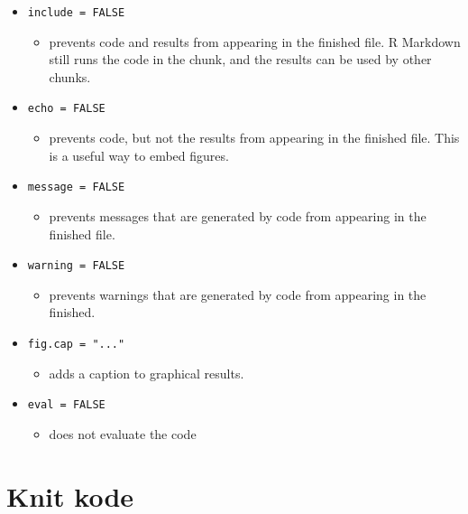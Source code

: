\documentclass[
]{book}
\providecommand{\tightlist}{%
  \setlength{\itemsep}{0pt}\setlength{\parskip}{0pt}}
\begin{document}
\begin{itemize}
\tightlist
\item
  \texttt{include\ =\ FALSE}

  \begin{itemize}
  \tightlist
  \item
    prevents code and results from appearing in the finished file. R Markdown still runs the code in the chunk, and the results can be used by other chunks.
  \end{itemize}
\item
  \texttt{echo\ =\ FALSE}

  \begin{itemize}
  \tightlist
  \item
    prevents code, but not the results from appearing in the finished file. This is a useful way to embed figures.
  \end{itemize}
\item
  \texttt{message\ =\ FALSE}

  \begin{itemize}
  \tightlist
  \item
    prevents messages that are generated by code from appearing in the finished file.
  \end{itemize}
\item
  \texttt{warning\ =\ FALSE}

  \begin{itemize}
  \tightlist
  \item
    prevents warnings that are generated by code from appearing in the finished.
  \end{itemize}
\item
  \texttt{fig.cap\ =\ "..."}

  \begin{itemize}
  \tightlist
  \item
    adds a caption to graphical results.
  \end{itemize}
\item
  \texttt{eval\ =\ FALSE}

  \begin{itemize}
  \tightlist
  \item
    does not evaluate the code
  \end{itemize}
\end{itemize}

\hypertarget{knit-kode}{%
\section{Knit kode}\label{knit-kode}}
\end{document}
